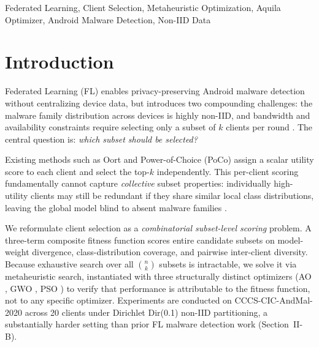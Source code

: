 \documentclass[conference]{IEEEtran}
\begin{document}
\begin{IEEEkeywords}
Federated Learning, Client Selection, Metaheuristic Optimization, Aquila Optimizer, Android Malware Detection, Non-IID Data
\end{IEEEkeywords}

\section{Introduction}

Federated Learning (FL) \cite{mcmahan2017} enables privacy-preserving Android malware detection without centralizing device data, but introduces two compounding challenges: the malware family distribution across devices is highly non-IID, and bandwidth and availability constraints require selecting only a subset of $k$ clients per round \cite{bonawitz2019scale}. The central question is: \emph{which subset should be selected?}

Existing methods such as Oort \cite{lai2021oort} and Power-of-Choice (PoCo) \cite{cho2022poco} assign a scalar utility score to each client and select the top-$k$ independently. This per-client scoring fundamentally cannot capture \emph{collective} subset properties: individually high-utility clients may still be redundant if they share similar local class distributions, leaving the global model blind to absent malware families \cite{balakrishnan2022divfl}.

We reformulate client selection as a \emph{combinatorial subset-level scoring} problem. A three-term composite fitness function scores entire candidate subsets on model-weight divergence, class-distribution coverage, and pairwise inter-client diversity. Because exhaustive search over all $\binom{n}{k}$ subsets is intractable, we solve it via metaheuristic search, instantiated with three structurally distinct optimizers (AO \cite{abualigah2021aquila}, GWO \cite{mirjalili2014gwo}, PSO \cite{kennedy1995pso}) to verify that performance is attributable to the fitness function, not to any specific optimizer. Experiments are conducted on CCCS-CIC-AndMal-2020 across 20 clients under Dirichlet Dir(0.1) non-IID partitioning, a substantially harder setting than prior FL malware detection work (Section~II-B).
\end{document}
